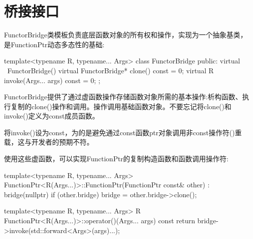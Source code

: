 \section{桥接接口}
FunctorBridge类模板负责底层函数对象的所有权和操作，实现为一个抽象基类，是FunctionPtr动态多态性的基础:

\begin{cpp}
template<typename R, typename... Args>
class FunctorBridge
{
	public:
	virtual ~FunctorBridge() {
	}
	virtual FunctorBridge* clone() const = 0;
	virtual R invoke(Args... args) const = 0;
};
\end{cpp}

FunctorBridge提供了通过虚函数操作存储函数对象所需的基本操作:析构函数、执行复制的clone()操作和调用。操作调用基础函数对象。不要忘记将clone()和invoke()定义为const成员函数。

\begin{notice}
将invoke()设为const，为的是避免通过const函数ptr对象调用非const操作符()重载，这与开发者的预期不符。
\end{notice}

使用这些虚函数，可以实现FunctionPtr的复制构造函数和函数调用操作符:

\begin{cpp}
template<typename R, typename... Args>
FunctionPtr<R(Args...)>::FunctionPtr(FunctionPtr const& other)
: bridge(nullptr)
{
	if (other.bridge) {
		bridge = other.bridge->clone();
	}
}

template<typename R, typename... Args>
R FunctionPtr<R(Args...)>::operator()(Args... args) const
{
	return bridge->invoke(std::forward<Args>(args)...);
}
\end{cpp}














































